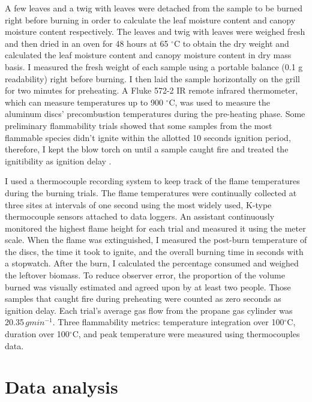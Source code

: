 \documentclass[12pt]{report}
\begin{document}
A few leaves and a twig with leaves were detached from the sample to be burned right before burning in order to calculate the leaf moisture content and canopy moisture content respectively. The leaves and twig with leaves were weighed fresh and then dried in an oven for 48 hours at 65 $^{\circ}$C to obtain the dry weight and calculated the leaf moisture content and canopy moisture content in dry mass basis.
I measured the fresh weight of each sample using a portable balance (0.1 g readability) right before burning. %
I then laid the sample horizontally on the grill for two minutes for preheating. A Fluke 572-2 IR remote infrared thermometer, which can measure temperatures up to 900 $^{\circ}$C, was used to measure the aluminum discs' precombustion temperatures during the pre-heating phase. Some preliminary flammability trials %
showed that some samples from the most flammable species didn't ignite within the allotted 10 seconds ignition period, therefore, I kept the blow torch on until a sample caught fire and treated the ignitibility as ignition delay \citep{anderson1970forest}.  

I used a thermocouple recording system to keep track of the flame temperatures during the burning trials. The flame temperatures were continually collected at three sites at intervals of one second using the most widely used, K-type thermocouple sensors \citep{mcgranahan2020inconvenient} attached to data loggers. %
An assistant continuously monitored the highest flame height for each trial and measured it using the meter scale. When the flame was extinguished, I measured the post-burn temperature of the discs, the time it took to ignite, and the overall burning time in seconds with a stopwatch. After the burn, I calculated the percentage consumed and weighed the leftover biomass. To reduce observer error, the proportion of the volume burned was visually estimated and agreed upon by at least two people. Those samples that caught fire during preheating were counted as zero seconds as ignition delay. Each trial's average gas flow from the propane gas cylinder was 20.35\,$g min^{-1}$. Three flammability metrics: temperature integration over 100$^{\circ}$C, duration over 100$^{\circ}$C, and peak temperature were measured using thermocouples data.

\section{Data analysis}
\end{document}
